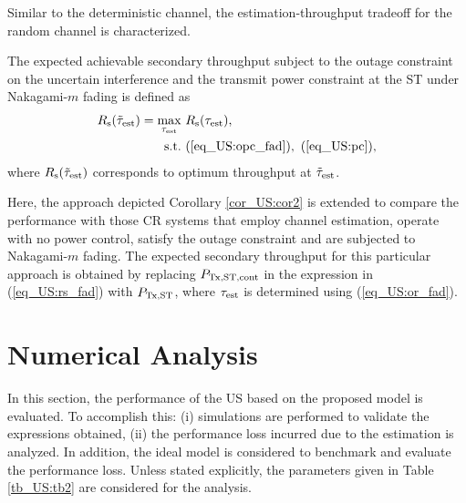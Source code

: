 Similar to the deterministic channel, the estimation-throughput tradeoff for the random channel is characterized. 
\begin{theorem} \label{th_US:th2}
\normalfont
The expected achievable secondary throughput subject to the outage constraint on the uncertain interference and the transmit power constraint at the ST under Nakagami-$m$ fading is defined as
\begin{align}
R_{\text{s}}(\tilde{\tau}_{\text{est}}) = \operatorname*{max}_{\tau_{\text{est}}}  & \text{      } {R_{\text{s}}(\tau_{\text{est}})}, 
 \label{eq_US:sys_fad} \\
\text{s.t.} & \text{ } (\ref{eq_US:opc_fad}), \text{  } (\ref{eq_US:pc}), \nonumber 
 \end{align}
where $R_{\text{s}}(\tilde{\tau}_{\text{est}})$ corresponds to optimum throughput at $\tilde{\tau}_{\text{est}}$.  
\end{theorem}

\begin{coro} \label{cor_US:cor3}
\normalfont
Here, the approach depicted Corollary \ref{cor_US:cor2} is extended to compare the performance with those CR systems that employ channel estimation, operate with no power control, satisfy the outage constraint and are subjected to Nakagami-$m$ fading. The expected secondary throughput for this particular approach is obtained by replacing $P_{\text{Tx,ST,cont}}$ in the expression in (\ref{eq_US:rs_fad}) with $P_{\text{Tx,ST}}$, where $\tau_{\text{est}}$ is determined using (\ref{eq_US:or_fad}). 

\end{coro}
 
\section{Numerical Analysis} \label{sec_US:num_ana}
In this section, the performance of the US based on the proposed model is evaluated. To accomplish this: (i) simulations are performed to validate the expressions obtained, (ii) the performance loss incurred due to the estimation is analyzed. In addition, the ideal model is considered to benchmark and evaluate the performance loss. %
Unless stated explicitly, the parameters given in Table \ref{tb_US:tb2} are considered for the analysis.%


